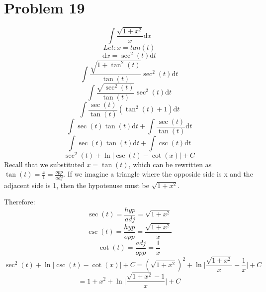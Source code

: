 \documentclass[letterpaper, 12pt]{article}
\newcommand*{\diff}{\mathrm{d}}
\begin{document}
\section*{Problem 19}
\[ \int{\frac{\sqrt{1+x^{2}}}{x}\diff{x}} \]
\[ Let: x = tan(t) \]
\[ \diff{x} = \sec^{2}(t)\diff{t} \]
\[ \int{\frac{\sqrt{1+\tan^{2}(t)}}{\tan(t)}\sec^{2}(t)\diff{t}} \]
\[ \int{\frac{\sqrt{\sec^{2}(t)}}{\tan(t)}\sec^{2}(t)\diff{t}} \]
\[ \int{\frac{\sec(t)}{\tan(t)}(\tan^{2}(t)+1)\diff{t}} \]
\[ \int{\sec(t)\tan(t)\diff{t}}+\int{\frac{\sec(t)}{\tan(t)}\diff{t}} \]
\[ \int{\sec(t)\tan(t)\diff{t}}+\int{\csc(t)}\diff{t} \]
\[ \sec^{2}(t)+\ln|\csc(t)-\cot(x)|+C \]
Recall that we substituted \( x=\tan(t) \), which can be rewritten as
\( \tan(t) = \frac{x}{1} = \frac{opp}{adj} \). If we imagine a triangle where
the opposide side is x and the adjacent side is 1, then the hypotenuse must be
\( \sqrt{1+x^{2}} \).
\begin{center}
\end{center}
Therefore:
\[ \sec(t) = \frac{hyp}{adj} = \sqrt{1+x^{2}} \]
\[ \csc(t) = \frac{hyp}{opp} = \frac{\sqrt{1+x^{2}}}{x} \]
\[ \cot(t) = \frac{adj}{opp} = \frac{1}{x} \]
\[ \sec^{2}(t)+\ln|\csc(t)-\cot(x)|+C = (\sqrt{1+x^{2}})^{2}+
   \ln\bigg|\frac{\sqrt{1+x^{2}}}{x}-\frac{1}{x}\bigg|+C \]
\[ = 1+x^{2}+\ln\bigg|\frac{\sqrt{1+x^{2}}-1}{x}\bigg|+C \]
\end{document}
